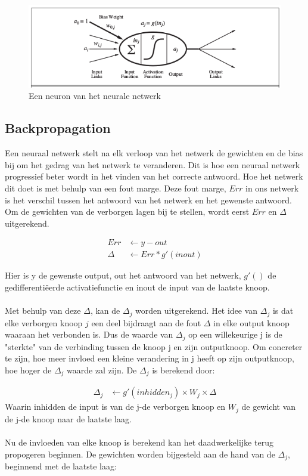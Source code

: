 \documentclass[10pt]{article}
\begin{document}
\begin{figure}[ht]
    \centering
    \includegraphics[scale=0.6]{images/neuron.png}
    \caption{Een neuron van het neurale netwerk}
    \label{fig:my_label}
\end{figure}

\subsection{Backpropagation}
Een neuraal netwerk stelt na elk verloop van het netwerk de gewichten en de bias bij om het gedrag van het netwerk te veranderen. Dit is hoe een neuraal netwerk progressief beter wordt in het vinden van het correcte antwoord. Hoe het netwerk dit doet is met behulp van een fout marge. Deze fout marge, $Err$ in ons netwerk is het verschil tussen het antwoord van het netwerk en het gewenste antwoord. Om de gewichten van de verborgen lagen bij te stellen, wordt eerst $Err$ en $\Delta$ uitgerekend. 

\begin{align*}
    Err & \leftarrow y - out \\
    \Delta & \leftarrow Err * g'(inout)
\end{align*}

Hier is y de gewenste output, out het antwoord van het netwerk, $g'()$ de gedifferenti\"eerde activatiefunctie en inout de input van de laatste knoop.
\\\\
Met behulp van deze $\Delta$, kan de $\Delta_j$ worden uitgerekend. Het idee van $\Delta_j$ is dat elke verborgen knoop $j$ een deel bijdraagt aan de fout $\Delta$ in elke output knoop waaraan het verbonden is. Dus de waarde van $\Delta_j$ op een willekeurige j is de "sterkte" van de verbinding tussen de knoop j en zijn outputknoop. Om concreter te zijn, hoe meer invloed een kleine verandering in j heeft op zijn outputknoop, hoe hoger de $\Delta_j$ waarde zal zijn. De $\Delta_j$ is berekend door:

\begin{align*}
    \Delta_j & \leftarrow g'(inhidden_j) \times W_j \times \Delta
\end{align*}
Waarin inhidden de input is van de j-de verborgen knoop en $W_j$ de gewicht van de j-de knoop naar de laatste laag.
\\\\
Nu de invloeden van elke knoop is berekend kan het daadwerkelijke terug propogeren beginnen.
De gewichten worden bijgesteld aan de hand van de $\Delta_j$, beginnend met de laatste laag:
\end{document}
